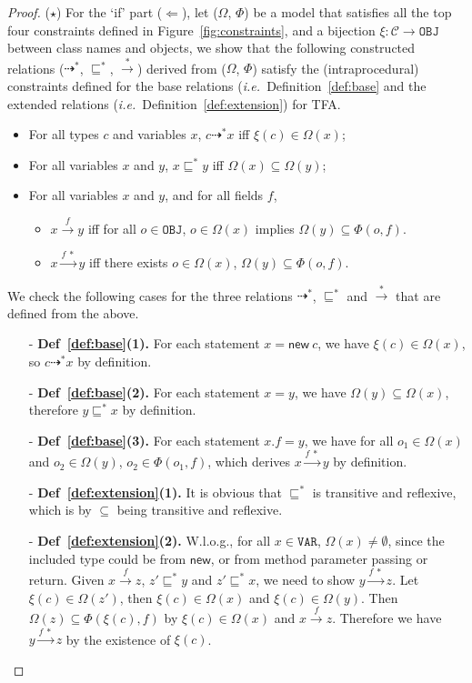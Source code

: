 \documentclass{fac}
\newcommand\ie{\textit{i.e.\ }}
\newcommand{\keyword}[1]{\mathsf{#1}}
\newcommand{\kwnew}[0]{\keyword{new}}
\newcommand\Var{\mathtt{VAR}}
\newcommand\Obj{\mathtt{OBJ}}
\newcommand{\VPT}{\Omega}
\newcommand{\HPT}{\Phi}
\newcommand{\Class}{\mathcal{C}}
\newcommand{\less}{\sqsubseteq}
\newcommand{\tflow}{\dashrightarrow}
\newcommand{\hflow}{\longrightarrow}
\newcommand{\lhflow}[1]{\stackrel{#1}{\hflow}}
\begin{document}
\begin{proof}
($\star$) For the `if' part ($\Leftarrow$), let ($\VPT$, $\HPT$) be a model that satisfies all the top four constraints defined in Figure~\ref{fig:constraints}, and a bijection $\xi:\Class\rightarrow\Obj$ between class names and objects, we show that the following constructed relations ($\tflow^*$, $\less^*$, $\lhflow{*}$) derived from ($\VPT$, $\HPT$) satisfy the (intraprocedural) constraints defined for the base relations (\ie Definition~\ref{def:base} and the extended relations (\ie Definition~\ref{def:extension}) for TFA.
\begin{itemize}
  \item For all types $c$ and variables $x$, $c\tflow^* x$ iff $\xi(c)\in\VPT(x)$;
  \item For all variables $x$ and $y$, $x\less^*y$ iff $\VPT(x)\subseteq\VPT(y)$;
  \item For all variables $x$ and $y$, and for all fields $f$, \begin{itemize}
    \item $x\lhflow{f}y$ iff for all $o\in\Obj$, $o\in\VPT(x)$ implies $\VPT(y)\subseteq\HPT(o,f)$.
    \item $x\lhflow{f\ *}y$ iff there exists $o\in\VPT(x)$, $\VPT(y)\subseteq\HPT(o,f)$.
  \end{itemize}
\end{itemize}
We check the following cases for the three relations $\tflow^*$, $\less^*$ and $\lhflow{*}$ that are defined from the above.
\begin{itemize}
\item[-] \textbf{Def~\ref{def:base}(1).} For each statement $x = \kwnew\ c$, we have $\xi(c)\in\VPT(x)$, so $c\tflow^* x$ by definition.
\item[-] \textbf{Def~\ref{def:base}(2).} For each statement $x = y$, we have $\VPT(y)\subseteq\VPT(x)$, therefore $y\less^*x$ by definition.
\item[-] \textbf{Def~\ref{def:base}(3).} For each statement $x.f = y$, we have for all $o_1\in\VPT(x)$ and $o_2\in\VPT(y)$, $o_2\in\HPT(o_1,f)$, which derives $x\lhflow{f\ *}y$ by definition.
\item[-] \textbf{Def~\ref{def:extension}(1).} It is obvious that $\less^*$ is transitive and reflexive, which is by $\subseteq$ being transitive and reflexive.
\item[-] \textbf{Def~\ref{def:extension}(2).} W.l.o.g., for all $x\in\Var$, $\VPT(x)\neq\emptyset$, since the included type could be from $\kwnew$, or from method parameter passing or return. Given $x\lhflow{f}z$, $z'\less^*y$ and $z'\less^*x$, we need to show $y\lhflow{f\ *}z$.
    Let $\xi(c)\in\VPT(z')$, then $\xi(c)\in\VPT(x)$ and $\xi(c)\in\VPT(y)$. Then $\VPT(z)\subseteq\HPT(\xi(c),f)$ by $\xi(c)\in\VPT(x)$ and $x\lhflow{f}z$. Therefore we have $y\lhflow{f\ *}z$ by the existence of $\xi(c)$.


\end{itemize}
\end{proof}
\end{document}
